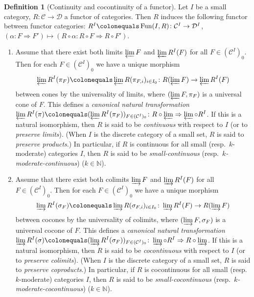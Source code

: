 \documentclass{surv-l}
\numberwithin{equation}{chapter}
\numberwithin{figure}{chapter}
\theoremstyle{plain}
\theoremstyle{definition}
\newtheorem{dfn}[thm]{Definition}
\theoremstyle{remark}
\DeclareMathOperator{\Fun}{Fun}
\begin{document}
\begin{dfn}[Continuity and cocontinuity of a functor]
\label{dfn:conti-coconti}
Let $I$ be a small category, $R \colon {\mathcal{C}} \to {\mathcal{D}}$ a functor of categories.
Then $R$ induces the following functor between functor categories:
$R^I\colonequals  \Fun(I,R) \colon {\mathcal{C}}^I \to {\mathcal{D}}^I$,
$(\alpha \colon F \Rightarrow F') \mapsto (R \circ \alpha \colon R \circ F \Rightarrow R \circ F')$.
\begin{enumerate}
\item
Assume that there exist both limits $\varprojlim F$ and $\varprojlim R^I(F)$ for all
$F \in ({\mathcal{C}}^I)_0$.
Then for each $F \in ({\mathcal{C}}^I)_0$ we have a unique morphism
\[
\varprojlim R^I(\pi_F)\colonequals  \varprojlim R(\pi_{F,i})_{i\in I_0} \colon R(\varprojlim F) \to \varprojlim R^I(F)
\]
between cones by the universality of limits, where
$(\varprojlim F, \pi_F)$ is a universal cone of $F$.
This defines a \emph{canonical natural transformation}
$\varprojlim R^I(\pi)\colonequals  (\varprojlim R^I(\pi_F))_{F \in ({\mathcal{C}}^I)_0}
\colon R \circ \varprojlim \Rightarrow \varprojlim \circ R^I$.
If this is a natural isomorphism, then $R$ is said to be \emph{continuous}
with respect to $I$ (or to \emph{preserve limits}).
(When $I$ is the discrete category of a small set,
$R$ is said to \emph{preserve products}.)
In particular, if $R$ is continuous for all small (resp.\ $k$-moderate) categories $I$,
then $R$ is said to be \emph{small-continuous} (resp.\ \emph{$k$-moderate-continuous})
($k \in \mathbb{N}$).
\item
Assume that there exist both colimits $\varinjlim F$ and $\varinjlim R^I(F)$ for all
$F \in ({\mathcal{C}}^I)_0$.
Then for each $F \in ({\mathcal{C}}^I)_0$ we have a unique morphism
\[
\varinjlim R^I(\sigma_F)\colonequals  \varinjlim R(\sigma_{F,i})_{i\in I_0} \colon \varinjlim R^I(F) \to R(\varinjlim F)
\]
between cocones by the universality of colimits, where $(\varinjlim F, \sigma_F)$
is a universal cocone of $F$.
This defines a \emph{canonical natural transformation}
$\varinjlim R^I(\sigma)\colonequals  (\varinjlim R^I(\sigma_F))_{F \in ({\mathcal{C}}^I)_0}
\colon \varinjlim \circ R^I \Rightarrow R \circ \varinjlim$.
If this is a natural isomorphism, then $R$ is said to be \emph{cocontinuous}
with respect to $I$ (or to \emph{preserve colimits}).
(When $I$ is the discrete category of a small set,
$R$ is said to \emph{preserve coproducts}.)
In particular, if $R$ is cocontinuous for all small (resp.\ $k$-moderate) categories $I$,
then $R$ is said to be \emph{small-cocontinuous} (resp.\ \emph{$k$-moderate-cocontinuous})
($k \in \mathbb{N}$).

\end{enumerate}
\end{dfn}
\end{document}
